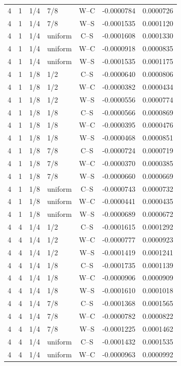 \begin{longtable}{rrllcrr}
4 & 1 & 1/4 & 7/8 & W--C & -0.0000784 & 0.0000726 \\
4 & 1 & 1/4 & 7/8 & W--S & -0.0001535 & 0.0001120 \\
4 & 1 & 1/4 & uniform & C--S & -0.0001608 & 0.0001330 \\
4 & 1 & 1/4 & uniform & W--C & -0.0000918 & 0.0000835 \\
4 & 1 & 1/4 & uniform & W--S & -0.0001535 & 0.0001175 \\
4 & 1 & 1/8 & 1/2 & C--S & -0.0000640 & 0.0000806 \\
4 & 1 & 1/8 & 1/2 & W--C & -0.0000382 & 0.0000434 \\
4 & 1 & 1/8 & 1/2 & W--S & -0.0000556 & 0.0000774 \\
4 & 1 & 1/8 & 1/8 & C--S & -0.0000566 & 0.0000869 \\
4 & 1 & 1/8 & 1/8 & W--C & -0.0000395 & 0.0000476 \\
4 & 1 & 1/8 & 1/8 & W--S & -0.0000468 & 0.0000851 \\
4 & 1 & 1/8 & 7/8 & C--S & -0.0000724 & 0.0000719 \\
4 & 1 & 1/8 & 7/8 & W--C & -0.0000370 & 0.0000385 \\
4 & 1 & 1/8 & 7/8 & W--S & -0.0000660 & 0.0000669 \\
4 & 1 & 1/8 & uniform & C--S & -0.0000743 & 0.0000732 \\
4 & 1 & 1/8 & uniform & W--C & -0.0000441 & 0.0000435 \\
4 & 1 & 1/8 & uniform & W--S & -0.0000689 & 0.0000672 \\
4 & 4 & 1/4 & 1/2 & C--S & -0.0001615 & 0.0001292 \\
4 & 4 & 1/4 & 1/2 & W--C & -0.0000777 & 0.0000923 \\
4 & 4 & 1/4 & 1/2 & W--S & -0.0001419 & 0.0001241 \\
4 & 4 & 1/4 & 1/8 & C--S & -0.0001735 & 0.0001139 \\
4 & 4 & 1/4 & 1/8 & W--C & -0.0000906 & 0.0000909 \\
4 & 4 & 1/4 & 1/8 & W--S & -0.0001610 & 0.0001018 \\
4 & 4 & 1/4 & 7/8 & C--S & -0.0001368 & 0.0001565 \\
4 & 4 & 1/4 & 7/8 & W--C & -0.0000782 & 0.0000822 \\
4 & 4 & 1/4 & 7/8 & W--S & -0.0001225 & 0.0001462 \\
4 & 4 & 1/4 & uniform & C--S & -0.0001432 & 0.0001535 \\
4 & 4 & 1/4 & uniform & W--C & -0.0000963 & 0.0000992 \\

\end{longtable}

